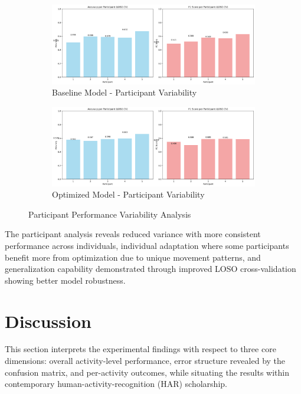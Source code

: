 \documentclass{iopconfser}
\begin{document}
\begin{figure}[H]
\centering
\begin{subfigure}{0.48\textwidth}
    \centering
    \includegraphics[width=\textwidth]{results/metrics/baseline/participant_performance.png}
    \caption{Baseline Model - Participant Variability}
    \label{fig:baseline_participants}
\end{subfigure}
\hfill
\begin{subfigure}{0.48\textwidth}
    \centering
    \includegraphics[width=\textwidth]{results/metrics/optimized/participant_performance.png}
    \caption{Optimized Model - Participant Variability}
    \label{fig:optimized_participants}
\end{subfigure}
\caption{Participant Performance Variability Analysis}
\label{fig:participant_performance}
\end{figure}

The participant analysis reveals reduced variance with more consistent performance across individuals, individual adaptation where some participants benefit more from optimization due to unique movement patterns, and generalization capability demonstrated through improved LOSO cross-validation showing better model robustness.

\section{Discussion}

This section interprets the experimental findings with respect to three core dimensions: overall activity-level performance, error structure revealed by the confusion matrix, and per-activity outcomes, while situating the results within contemporary human-activity-recognition (HAR) scholarship.
\end{document}
